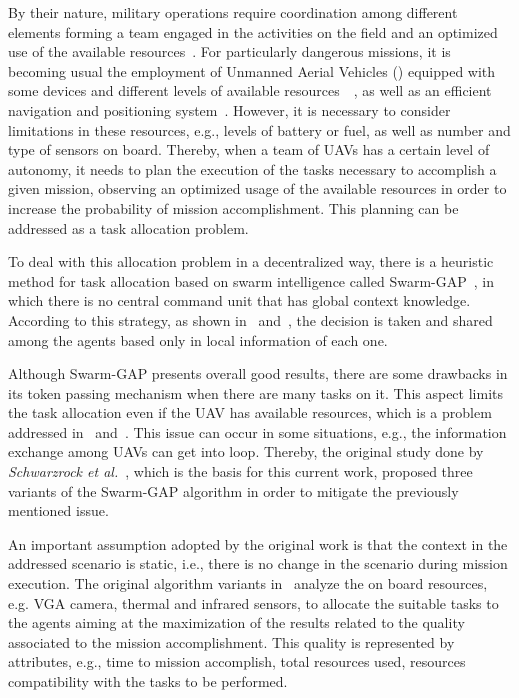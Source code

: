By their nature, military operations require coordination among different elements forming a team engaged in the activities on the field and an optimized use of the available resources~\citep{CC01}. For particularly dangerous missions, it is becoming usual the employment  of Unmanned Aerial Vehicles (\uav) equipped with some devices and different levels of available resources~\citep{nonami2010autonomous}~\citep{UAV01}, as well as an efficient navigation and positioning system~\citep{UAV10}. However, it is necessary to consider limitations in these resources, e.g., levels of battery or fuel, as well as number and type of sensors on board. Thereby, when a team of UAVs has a certain level of autonomy, it needs to plan the execution of the tasks necessary to accomplish a given mission, observing an optimized usage of the available resources in order to increase the probability of mission accomplishment. This planning can be addressed as a task allocation problem.

To deal with this allocation problem in a decentralized way, there is a heuristic method for task allocation based on swarm intelligence called Swarm-GAP~\citep{ferreira2007swarm}, in which there is no central command unit that has global context knowledge. According to this strategy, as shown in~\citep{MOEA07} and~\citep{MOEA05}, the decision is taken and shared among the agents based only in local information of each one.

Although Swarm-GAP presents overall good results, there are some drawbacks in its token passing mechanism when there are many tasks on it. This aspect limits the task allocation even if the UAV has available resources, which is a problem addressed in~\citep{MOEA07} and~\citep{MAS07}. This issue can occur in some situations, e.g., the information exchange among UAVs can get into loop. Thereby, the original study done by \textit{Schwarzrock et al.}~\citep{MAS07}, which is the basis for this current work, proposed three variants of the Swarm-GAP algorithm in order to mitigate the previously mentioned issue.

An important assumption adopted by the original work is that the context in the addressed scenario is static, i.e., there is no change in the scenario during mission execution. The original algorithm variants in~\citep{MAS07} analyze the on board resources, e.g. VGA camera, thermal and infrared sensors, to allocate the suitable tasks to the agents aiming at the maximization of the results related to the quality associated to the mission accomplishment. This quality is represented by attributes, e.g., time to mission accomplish, total resources used, resources compatibility with the tasks to be performed.


